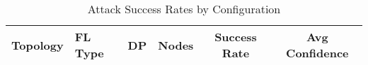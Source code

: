 

\begin{table}[h]
\centering
\caption{Attack Success Rates by Configuration}
\label{tab:attack_success}
\begin{tabular}{|l|l|l|c|c|c|}
\hline
Topology & FL Type & DP & Nodes & Success Rate & Avg Confidence \\
\hline
\end{tabular}
\end{table}
